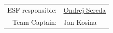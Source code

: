 \begin{table}[H]
	\centering
	\begin{tabular}{rl}
		ESF responsible: &  \href{mailto:ondrej.sereda@eforce.cvut.cz}{Ondrej Sereda}  \\
		Team Captain: & Jan Kosina   \\
	\end{tabular}%
	\label{tab:addlabel}%
\end{table}%



\vfill